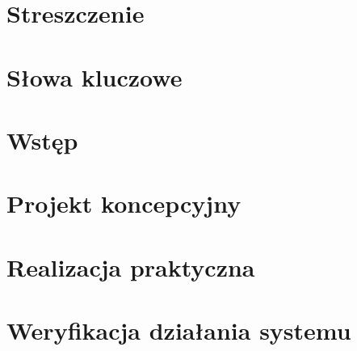 \documentclass[a4paper,12pt,twoside]{book}
\begin{document}


    
    \null\newpage
    \null\newpage


    \setcounter{page}{3}
    \raggedright
    \tableofcontents
    \null\newpage



    \chapter{Streszczenie}
    




    \chapter{Słowa kluczowe}
    




    \chapter{Wstęp}
    




    \chapter{Projekt koncepcyjny}
    




    \chapter{Realizacja praktyczna}
    




    \chapter{Weryfikacja działania systemu}
    
\end{document}
